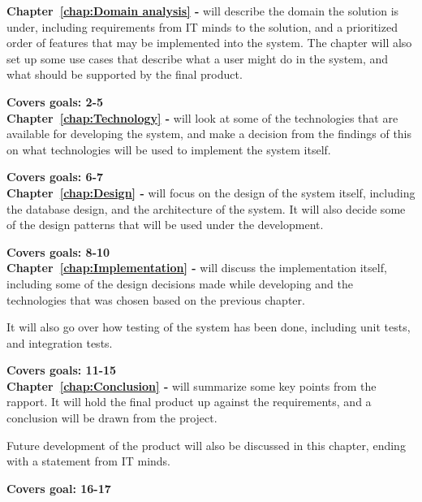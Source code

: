 \textbf{Chapter~\ref{chap:Domain analysis} - }
will describe the domain the solution is under, including requirements from IT
minds to the solution, and a prioritized order of features that may be
implemented into the system. The chapter will also set up some use cases that
describe what a user might do in the system, and what should be supported by the
final product. 

\textbf{Covers goals: 2-5}\\

\textbf{Chapter~\ref{chap:Technology} - } will look at
some of the technologies that are available for developing the system, and make
a decision from the findings of this on what technologies will be used to
implement the system itself. 

\textbf{Covers goals: 6-7}\\

\textbf{Chapter~\ref{chap:Design} - } will focus on the
design of the system itself, including the database design, and the architecture
of the system. It will also decide some of the design patterns that will be used
under the development. 

\textbf{Covers goals: 8-10}\\

\textbf{Chapter~\ref{chap:Implementation} - } will
discuss the implementation itself, including some of the design decisions made
while developing and the technologies that was chosen based on the previous
chapter. 

It will also go over how testing of the system has been done, including unit
tests, and integration tests. 

\textbf{Covers goals: 11-15}\\


\textbf{Chapter~\ref{chap:Conclusion} - } will
summarize some key points from the rapport. It will hold the final product up
against the requirements, and a conclusion will be drawn from the project.

Future development of the product will also be discussed in this chapter, ending
with a statement from IT minds. 

\textbf{Covers goal: 16-17}
